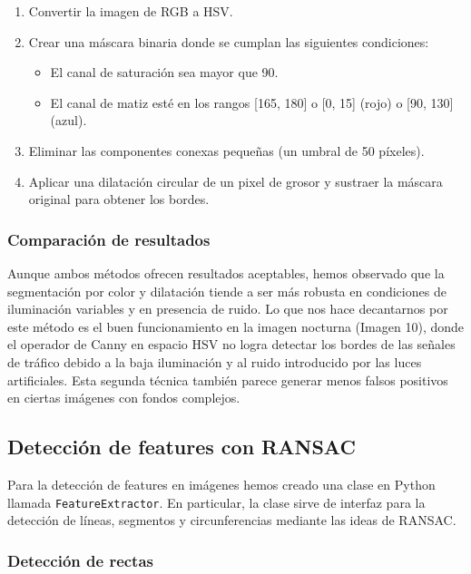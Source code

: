 \documentclass[11pt,a4paper]{article}
\begin{document}
\begin{enumerate}
    \item Convertir la imagen de RGB a HSV.
    \item Crear una máscara binaria donde se cumplan las siguientes condiciones:
    \begin{itemize}
        \item El canal de saturación sea mayor que 90.
        \item El canal de matiz esté en los rangos [165, 180] o [0, 15] (rojo) o [90, 130] (azul).
    \end{itemize}
    \item Eliminar las componentes conexas pequeñas (un umbral de 50 píxeles).
    \item Aplicar una dilatación circular de un pixel de grosor y sustraer la máscara original para obtener los bordes.
\end{enumerate}

\subsubsection{Comparación de resultados}

Aunque ambos métodos ofrecen resultados aceptables, hemos observado que la segmentación por color y dilatación tiende a ser más robusta en condiciones de iluminación variables y en presencia de ruido.
Lo que nos hace decantarnos por este método es el buen funcionamiento en la imagen nocturna (Imagen 10), donde el operador de Canny en espacio HSV no logra detectar los bordes de las señales de tráfico debido a la baja iluminación y al ruido introducido por las luces artificiales. 
Esta segunda técnica también parece generar menos falsos positivos en ciertas imágenes con fondos complejos.

\subsection{Detección de features con RANSAC}

Para la detección de features en imágenes hemos creado una clase en Python llamada \texttt{FeatureExtractor}. 
En particular, la clase sirve de interfaz para la detección de líneas, segmentos y circunferencias mediante las ideas de RANSAC.

\subsubsection{Detección de rectas}
\end{document}
